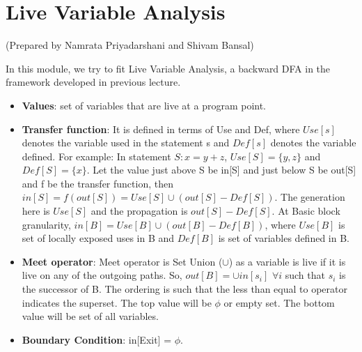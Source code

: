 \section {Live Variable Analysis}
\setlength{\parindent}{0pt}
(Prepared by Namrata Priyadarshani and Shivam Bansal)

\vspace{0.3cm}

In this module, we try to fit Live Variable Analysis, a backward DFA in the framework developed in previous lecture.

\begin{itemize}
    \item \textbf{Values}: set of variables that are live at a program point.
    \item \textbf{Transfer function}: It is defined in terms of Use and Def, where $Use[s]$ denotes the variable used in the statement s and $Def[s]$ denotes the variable defined.
    \newline
    For example: In statement $S: x=y+z$, $Use[S] = \{y,z\}$ and $Def[S] = \{x \}$.
    Let the value just above S be in[S] and just below S be out[S] and f be the transfer function, then $in[S] = f(out[S]) = Use[S] \cup (out[S] - Def[S])$. The generation here is $Use[S]$ and the propagation is $out[S] - Def[S]$.
    \newline
    \newline
    At Basic block granularity, $in[B] = Use[B] \cup (out[B] - Def[B])$, where $Use[B]$ is set of locally exposed uses in B and $Def[B]$ is set of variables defined in B.
    
    \item \textbf{Meet operator}: Meet operator is Set Union ($\cup$) as a variable is live if it is live on any of the outgoing paths. So, $out[B] = \cup in[s_{i}]$ $\forall i$ such that $s_{i}$ is the successor of B. 
    \newline
    The ordering is such that the less than equal to operator indicates the superset. The top value will be $\phi$ or empty set. The bottom value will be set of all variables.
    \item \textbf{Boundary Condition}: in[Exit] = $\phi$.
\end{itemize}
